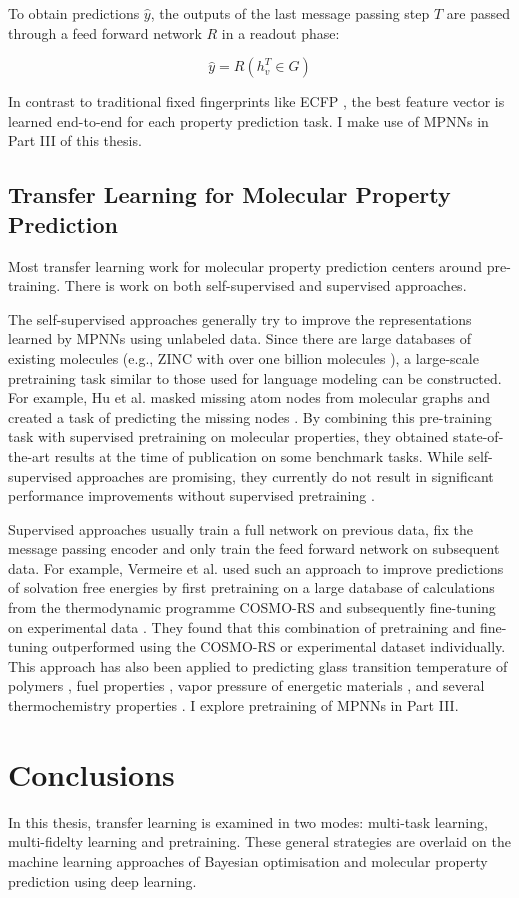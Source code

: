 To obtain predictions $\hat y$, the outputs of the last message passing step $T$ are passed through a feed forward network $R$ in a readout phase:

\begin{equation}
    \hat y = R(h_v^T \in G)
\end{equation}

In contrast to traditional fixed fingerprints like ECFP \cite{Rogers2010}, the best feature vector is learned end-to-end for each property prediction task. I make use of MPNNs in Part III of this thesis.

\subsection{Transfer Learning for Molecular Property Prediction}

Most transfer learning work for molecular property prediction centers around pre-training. There is work on both self-supervised and supervised approaches.

The self-supervised approaches generally try to improve the representations learned by MPNNs using unlabeled data. Since there are large databases of existing molecules (e.g., ZINC with over one billion molecules \cite{Irwin2020}), a large-scale pretraining task similar to those used for language modeling can be constructed. For example, Hu et al. masked missing atom nodes from molecular graphs and created a task of predicting the missing nodes \cite{Hu2020Pretrain}. By combining this pre-training task with supervised pretraining on molecular properties, they obtained state-of-the-art results at the time of publication on some benchmark tasks. While self-supervised approaches are promising, they currently do not result in significant performance improvements without supervised pretraining \cite{Sun2022}.

Supervised approaches usually train a full network on previous data, fix the message passing encoder and only train the feed forward network on subsequent data. For example, Vermeire et al. used such an approach to improve predictions of solvation free energies by first pretraining on a large database of calculations from the thermodynamic programme COSMO-RS and subsequently fine-tuning on experimental data \cite{Vermeire2021, Vermeire2022}. They found that this combination of pretraining and fine-tuning outperformed using the COSMO-RS or experimental dataset individually. This approach has also been applied to predicting glass transition temperature of polymers \cite{Volgin2022}, fuel properties \cite{Larsson2023}, vapor pressure of energetic materials \cite{Lansford2023}, and several thermochemistry properties \cite{Grambow2019, Ureel2023}. I explore pretraining of MPNNs in Part III.

\section{Conclusions}

In this thesis, transfer learning is examined in two modes: multi-task learning, multi-fidelty learning and pretraining. These general strategies are overlaid on the machine learning approaches of Bayesian optimisation and molecular property prediction using deep learning. 
